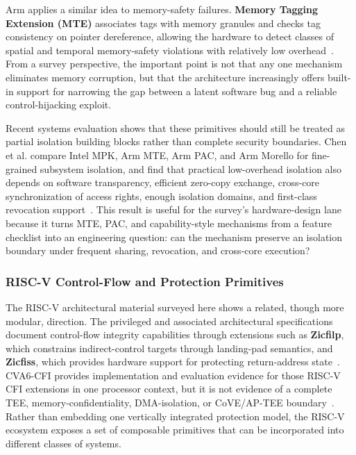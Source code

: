 Arm applies a similar idea to memory-safety failures. \textbf{Memory Tagging Extension (MTE)} associates tags with memory granules and checks tag consistency on pointer dereference, allowing the hardware to detect classes of spatial and temporal memory-safety violations with relatively low overhead~\cite{armv-a}. From a survey perspective, the important point is not that any one mechanism eliminates memory corruption, but that the architecture increasingly offers built-in support for narrowing the gap between a latent software bug and a reliable control-hijacking exploit.

Recent systems evaluation shows that these primitives should still be treated as partial isolation building blocks rather than complete security boundaries. Chen et al. compare Intel MPK, Arm MTE, Arm PAC, and Arm Morello for fine-grained subsystem isolation, and find that practical low-overhead isolation also depends on software transparency, efficient zero-copy exchange, cross-core synchronization of access rights, enough isolation domains, and first-class revocation support~\cite{chen2024hardwareisolation}. This result is useful for the survey's hardware-design lane because it turns MTE, PAC, and capability-style mechanisms from a feature checklist into an engineering question: can the mechanism preserve an isolation boundary under frequent sharing, revocation, and cross-core execution?

\subsubsection{RISC-V Control-Flow and Protection Primitives}

The RISC-V architectural material surveyed here shows a related, though more modular, direction. The privileged and associated architectural specifications document control-flow integrity capabilities through extensions such as \textbf{Zicfilp}, which constrains indirect-control targets through landing-pad semantics, and \textbf{Zicfiss}, which provides hardware support for protecting return-address state~\cite{riscv_privileged}. CVA6-CFI provides implementation and evaluation evidence for those RISC-V CFI extensions in one processor context, but it is not evidence of a complete TEE, memory-confidentiality, DMA-isolation, or CoVE/AP-TEE boundary~\cite{manoni2026cva6cfi}. Rather than embedding one vertically integrated protection model, the RISC-V ecosystem exposes a set of composable primitives that can be incorporated into different classes of systems.

